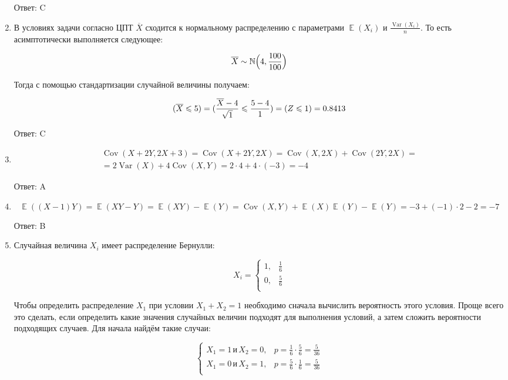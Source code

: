 \documentclass[11pt, a4paper]{article}
\DeclareMathOperator{\Var}{Var}
\DeclareMathOperator{\Cov}{Cov}
\DeclareMathOperator{\E}{\mathbb{E}}
\let\P\relax
\DeclareMathOperator{\P}{\mathbb{P}}
\newcommand \N{\mathbb{N}}
\theoremstyle{definition}
\begin{document}
\begin{enumerate}
	Ответ: C
	
	\item 
	
	В условиях задачи согласно ЦПТ $\overline{X}$ сходится к нормальному распределению с параметрами $\E(X_{i})$ и $\frac{\Var(X_{i})}{n}$. 
	То есть асимптотически выполняется следующее:
	
	\[
	\overline{X}\sim \N \Bigr(4, \frac{100}{100}\Bigl)
	\]
	
	Тогда с помощью стандартизации случайной величины получаем:
	
	\[
	\P(\overline{X}\leqslant 5)=\P(\frac{\overline{X}-4}{\sqrt{1}}\leqslant \frac{5-4}{1})=\P(Z\leqslant 1)=0.8413
	\]
	
	Ответ: C
	
	\item 
	
	\begin{gather*}
	\Cov(X+2Y, 2X+3)=\Cov(X+2Y, 2X)=\Cov(X,2X)+\Cov(2Y,2X)=\\=2\Var(X)+4\Cov(X,Y)=2\cdot4+4\cdot(-3)=-4
	\end{gather*}
	
	Ответ: A
	
	\item 
	
	\[
	\E((X-1)Y)=\E(XY-Y)=\E(XY)-\E(Y)=\Cov(X,Y)+\E(X)\E(Y)-\E(Y)=-3+(-1)\cdot2-2=-7
	\]
	
	Ответ: B
	
	\item 
	
	Случайная величина $X_{i}$ имеет распределение Бернулли:
	
	\[
	X_{i}=\begin{cases}
	1, &\frac{1}{6}\\
	0, &\frac{5}{6}\\
	\end{cases}
	\]
	
	Чтобы определить распределение $X_{1}$ при условии $X_{1}+X_{2}=1$ необходимо сначала вычислить вероятность этого условия. 
	Проще всего это сделать, если определить какие значения случайных величин подходят для выполнения условий, а затем сложить вероятности подходящих случаев. 
	Для начала найдём такие случаи:
	
	\[
	\begin{cases}
	X_{1}=1\, \text{и}\, X_{2}=0, &p=\frac{1}{6}\cdot \frac{5}{6}=\frac{5}{36}\\
	X_{1}=0\, \text{и}\, X_{2}=1, &p=\frac{5}{6}\cdot \frac{1}{6}=\frac{5}{36}\\
	\end{cases}
	\]
	

\end{enumerate}
\end{document}
